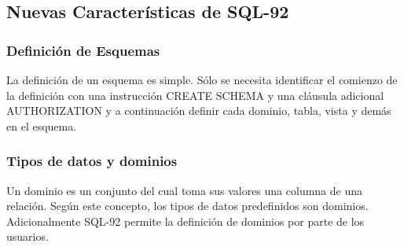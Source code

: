 \documentclass[preprint,12pt]{elsarticle}
\begin{document}
\subsection{\textbf{Nuevas Características de SQL-92 \cite{Caselles2011} }}

\subsubsection{\textbf{Definición de Esquemas}}

La definición de un esquema es simple. Sólo se necesita identificar el comienzo de la definición con una instrucción CREATE SCHEMA y una cláusula adicional AUTHORIZATION y a continuación definir cada dominio, tabla, vista y demás en el esquema. 

\subsubsection{\textbf{Tipos de datos y dominios \cite{Hernandez2008}}}	

Un dominio es un conjunto del cual toma sus valores una columna de una relación. Según este concepto, los tipos de datos predefinidos son dominios. Adicionalmente SQL-92 permite la definición de dominios por parte de los usuarios.
\end{document}
